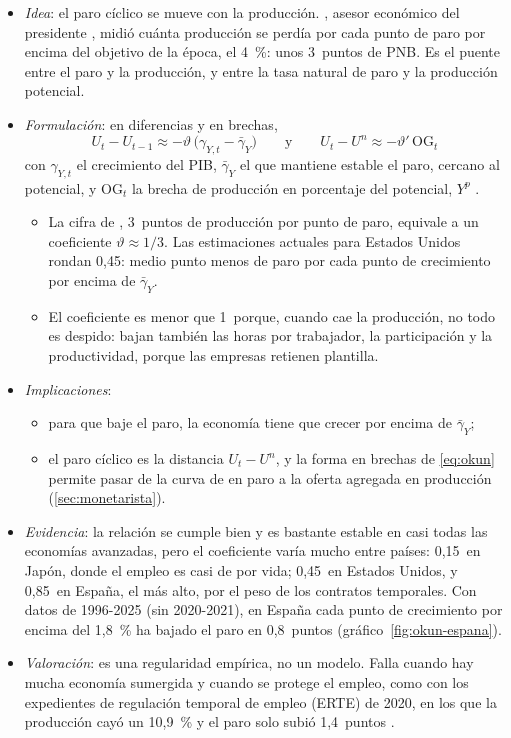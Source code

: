 \documentclass[11pt]{article}
\begin{document}
\begin{itemize}
\item \emph{Idea}: el paro cíclico se mueve con la producción. \textcite{Okun1962}, asesor económico del presidente , midió cuánta producción se perdía por cada punto de paro por encima del objetivo de la época, el 4~\%: unos 3~puntos de PNB. Es el puente entre el paro y la producción, y entre la tasa natural de paro y la producción potencial.
\item \emph{Formulación}: en diferencias y en brechas,
  \begin{equation}
  U_t-U_{t-1}\approx-\vartheta\,\big(\gamma_{Y,t}-\bar\gamma_Y\big)\qquad\text{y}\qquad U_t-U^n\approx-\vartheta'\,\mathrm{OG}_t \label{eq:okun}
  \end{equation}
  con $\gamma_{Y,t}$ el crecimiento del PIB, $\bar\gamma_Y$ el que mantiene estable el paro, cercano al potencial, y $\mathrm{OG}_t$ la brecha de producción en porcentaje del potencial, $Y^p$ .
  \begin{itemize}
  \item La cifra de , 3~puntos de producción por punto de paro, equivale a un coeficiente $\vartheta\approx1/3$. Las estimaciones actuales para Estados Unidos rondan 0,45: medio punto menos de paro por cada punto de crecimiento por encima de $\bar\gamma_Y$\nocite{Ball2017Okun}.
  \item El coeficiente es menor que 1~porque, cuando cae la producción, no todo es despido: bajan también las horas por trabajador, la participación y la productividad, porque las empresas retienen plantilla.
  \end{itemize}
\item \emph{Implicaciones}:
  \begin{itemize}
  \item para que baje el paro, la economía tiene que crecer por encima de $\bar\gamma_Y$;
  \item el paro cíclico es la distancia $U_t-U^n$, y la forma en brechas de \eqref{eq:okun} permite pasar de la curva de  en paro a la oferta agregada en producción (\ref{sec:monetarista}).
  \end{itemize}
\item \emph{Evidencia}: la relación se cumple bien y es bastante estable en casi todas las economías avanzadas, pero el coeficiente varía mucho entre países: 0,15~en Japón, donde el empleo es casi de por vida; 0,45~en Estados Unidos, y 0,85~en España, el más alto, por el peso de los contratos temporales\nocite{Ball2017Okun}. Con datos de 1996-2025 (sin 2020-2021), en España cada punto de crecimiento por encima del 1,8~\% ha bajado el paro en 0,8~puntos\nocite{Eurostat2026nama,CE2026AMECOParo} (gráfico~\ref{fig:okun-espana}).
\item \emph{Valoración}: es una regularidad empírica, no un modelo. Falla cuando hay mucha economía sumergida y cuando se protege el empleo, como con los expedientes de regulación temporal de empleo (ERTE) de 2020, en los que la producción cayó un 10,9~\% y el paro solo subió 1,4~puntos\nocite{Eurostat2026nama,CE2026AMECOParo} .
\end{itemize}
\end{document}
